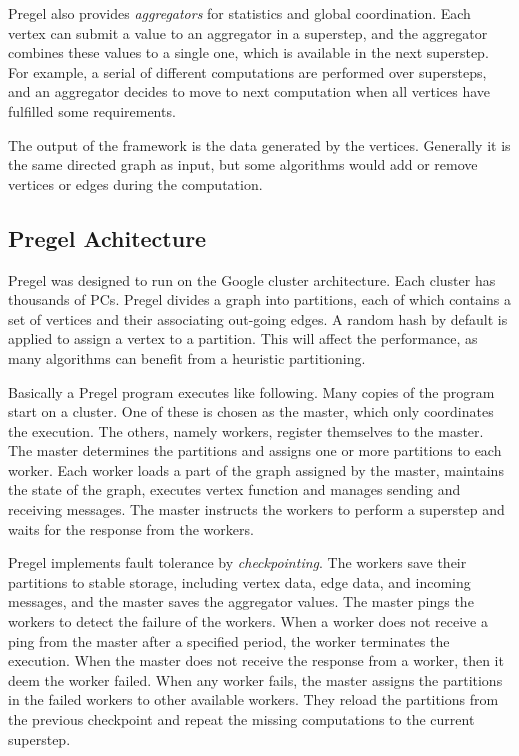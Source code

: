 Pregel also provides \textit{aggregators} for statistics and global coordination. Each vertex can submit a value to an aggregator in a superstep, and the aggregator combines these values to a single one, which is available in the next superstep. For example, a serial of different computations are performed over supersteps, and an aggregator decides to move to next computation when all vertices have fulfilled some requirements.

The output of the framework is the data generated by the vertices. Generally it is the same directed graph as input, but some algorithms would add or remove vertices or edges during the computation.

\subsection{Pregel Achitecture}

Pregel was designed to run on the Google cluster architecture. Each cluster has thousands of PCs. Pregel divides a graph into partitions, each of which contains a set of vertices and their associating out-going edges. A random hash by default is applied to assign a vertex to a partition. This will affect the performance, as many algorithms can benefit from a heuristic partitioning.

Basically a Pregel program executes like following. Many copies of the program start on a cluster. One of these is chosen as the master, which only coordinates the execution. The others, namely workers, register themselves to the master. The master determines the partitions and assigns one or more partitions to each worker. Each worker loads a part of the graph assigned by the master, maintains the state of the graph, executes vertex function and manages sending and receiving messages. The master instructs the workers to perform a superstep and waits for the response from the workers.

Pregel implements fault tolerance by \textit{checkpointing}. The workers save their partitions to stable storage, including vertex data, edge data, and incoming messages, and the master saves the aggregator values. The master pings the workers to detect the failure of the workers. When a worker does not receive a ping from the master after a specified period, the worker terminates the execution. When the master does not receive the response from a worker, then it deem the worker failed. When any worker fails, the master assigns the partitions in the failed workers to other available workers. They reload the partitions from the previous checkpoint and repeat the missing computations to the current superstep.

